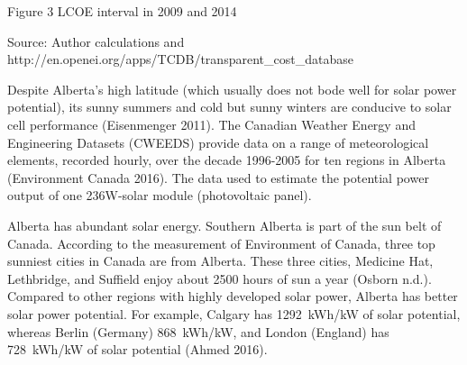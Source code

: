 Figure 3 LCOE interval in 2009 and 2014

Source: Author calculations and
http://en.openei.org/apps/TCDB/transparent\_cost\_database

Despite Alberta's high latitude (which usually does not bode well for
solar power potential), its sunny summers and cold but sunny winters are
conducive to solar cell performance (Eisenmenger 2011). The Canadian
Weather Energy and Engineering Datasets (CWEEDS) provide data on a range
of meteorological elements, recorded hourly, over the decade 1996-2005
for ten regions in Alberta (Environment Canada 2016). The data used to
estimate the potential power output of one 236W-solar module
(photovoltaic panel).

Alberta has abundant solar energy. Southern Alberta is part of the sun
belt of Canada. According to the measurement of Environment of Canada,
three top sunniest cities in Canada are from Alberta. These three
cities, Medicine Hat, Lethbridge, and Suffield enjoy about 2500 hours of
sun a year (Osborn n.d.). Compared to other regions with highly
developed solar power, Alberta has better solar power potential. For
example, Calgary has 1292~kWh/kW of solar potential, whereas Berlin
(Germany) 868~kWh/kW, and London (England) has 728~kWh/kW of solar
potential (Ahmed 2016).